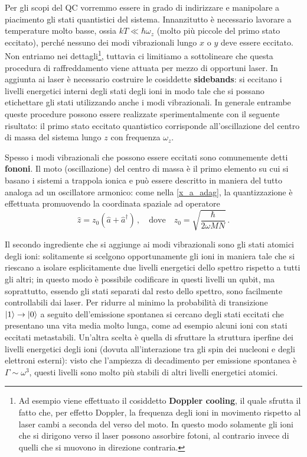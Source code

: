 \noindent Per gli scopi del QC vorremmo essere in grado di indirizzare e manipolare a piacimento gli stati quantistici del sistema. Innanzitutto è necessario lavorare a temperature molto basse, ossia $k T \ll \hbar \omega_z$ (molto più piccole del primo stato eccitato), perché nessuno dei modi vibrazionali lungo $x$ o $y$ deve essere eccitato. Non entriamo nei dettagli\footnote{Ad esempio viene effettuato il cosiddetto \textbf{Doppler cooling}, il quale sfrutta il fatto che, per effetto Doppler, la frequenza degli ioni in movimento rispetto al laser cambi a seconda del verso del moto. In questo modo solamente gli ioni che si dirigono verso il laser possono assorbire fotoni, al contrario invece di quelli che si muovono in direzione contraria.}, tuttavia ci limitiamo a sottolineare che questa procedura di raffreddamento viene attuata per mezzo di opportuni laser. In aggiunta ai laser è necessario costruire le cosiddette \textbf{sidebands}: si eccitano i livelli energetici interni degli stati degli ioni in modo tale che si possano etichettare gli stati utilizzando anche i modi vibrazionali. In generale entrambe queste procedure possono essere realizzate sperimentalmente con il seguente risultato: il primo stato eccitato quantistico corrisponde all'oscillazione del centro di massa del sistema lungo $z$ con frequenza $\omega_z$. 

\noindent Spesso i modi vibrazionali che possono essere eccitati sono comunemente detti \textbf{fononi}. Il moto (oscillazione) del centro di massa è il primo elemento su cui si basano i sistemi a trappola ionica e può essere descritto in maniera del tutto analoga ad un oscillatore armonico: come nella \eqref{x_a_adag}, la quantizzazione è effettuata promuovendo la coordinata spaziale ad operatore
\begin{equation*}
    \hat{z} = z_0 (\hat{a} + \hat{a}^\dag) \, , \quad \text{dove} \quad z_0 = \sqrt{\frac{\hbar}{2 \omega M N}} \, .
\end{equation*}

\noindent Il secondo ingrediente che si aggiunge ai modi vibrazionali sono gli stati atomici degli ioni: solitamente si scelgono opportunamente gli ioni in maniera tale che si riescano a isolare esplicitamente due livelli energetici dello spettro rispetto a tutti gli altri; in questo modo è possibile codificare in questi livelli un qubit, ma soprattutto, essendo gli stati separati dal resto dello spettro, sono facilmente controllabili dai laser.  Per ridurre al minimo la probabilità di transizione $\ket{1} \to \ket{0} $ a seguito dell'emissione spontanea si cercano degli stati eccitati che presentano una vita media molto lunga, come ad esempio alcuni ioni con stati eccitati metastabili. Un'altra scelta è quella di sfruttare la struttura iperfine dei livelli energetici degli ioni (dovuta all'interazione tra gli spin dei nucleoni e degli elettroni esterni): visto che l'ampiezza di decadimento per emissione spontanea \`e $\Gamma \sim \omega^3$, questi livelli sono molto più stabili di altri livelli energetici atomici.  


